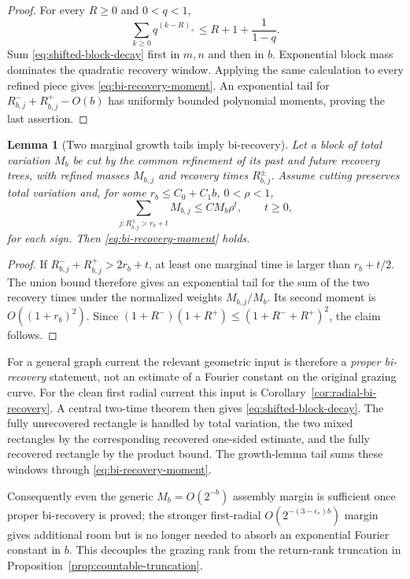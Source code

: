 \documentclass[11pt]{article}
\newtheorem{lemma}[theorem]{Lemma}
\begin{document}
\begin{proof}
For every $R\ge0$ and $0<q<1$,
\[
 \sum_{k\ge0}q^{(k-R)_+}
 \le R+1+\frac1{1-q}.
\]
Sum \eqref{eq:shifted-block-decay} first in $m,n$ and then in $b$.
Exponential block mass dominates the quadratic recovery window.  Applying the
same calculation to every refined piece gives
\eqref{eq:bi-recovery-moment}.  An exponential tail for
$R_{b,j}^-+R_{b,j}^+-O(b)$ has uniformly bounded polynomial moments, proving
the last assertion.
\end{proof}

\begin{lemma}[Two marginal growth tails imply bi-recovery]
\label{lem:marginal-to-bi-recovery}
Let a block of total variation $M_b$ be cut by the common refinement of its
past and future recovery trees, with refined masses $M_{b,j}$ and recovery
times $R_{b,j}^\pm$.  Assume cutting preserves total variation and, for some
$r_b\le C_0+C_1b$, $0<\rho<1$,
\[
 \sum_{j:R_{b,j}^\pm>r_b+t}M_{b,j}
 \le CM_b\rho^t,
 \qquad t\ge0,
\]
for each sign.  Then \eqref{eq:bi-recovery-moment} holds.
\end{lemma}

\begin{proof}
If $R_{b,j}^-+R_{b,j}^+>2r_b+t$, at least one marginal time is larger than
$r_b+t/2$.  The union bound therefore gives an exponential tail for the sum
of the two recovery times under the normalized weights $M_{b,j}/M_b$.
Its second moment is $O((1+r_b)^2)$.  Since
$(1+R^-)(1+R^+)\le(1+R^-+R^+)^2$, the claim follows.
\end{proof}

For a general graph current the relevant geometric input is therefore a
\emph{proper bi-recovery} statement, not an estimate of a Fourier constant on
the original grazing curve.  For the clean first radial current this input is
Corollary~\ref{cor:radial-bi-recovery}.  A central two-time theorem then gives
\eqref{eq:shifted-block-decay}.  The fully unrecovered rectangle is handled by
total variation, the two mixed rectangles by the corresponding recovered
one-sided estimate, and the fully recovered rectangle by the product bound.
The growth-lemma tail sums these windows through
\eqref{eq:bi-recovery-moment}.

Consequently even the generic $M_b=O(2^{-b})$ assembly margin is sufficient
once proper bi-recovery is proved; the stronger first-radial
$O(2^{-(3-\epsilon_*)b})$ margin gives additional room but is no longer
needed to absorb an exponential Fourier constant in $b$.  This decouples the
grazing rank from the return-rank truncation in
Proposition~\ref{prop:countable-truncation}.
\end{document}
